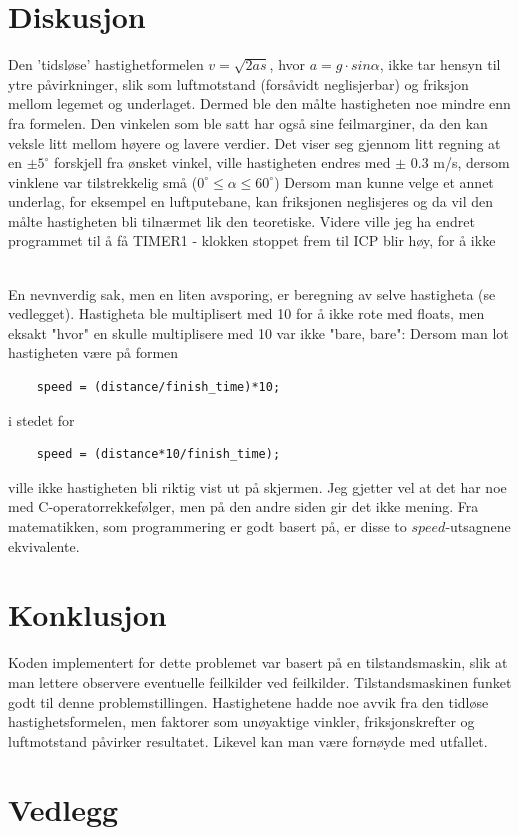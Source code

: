 \documentclass[11pt, a4paper]{article}
\begin{document}
\section{Diskusjon}

Den 'tidsløse' hastighetformelen $v = \sqrt{2as}$, hvor $a = g\cdot sin\alpha$, ikke tar hensyn til ytre påvirkninger, slik som luftmotstand (forsåvidt neglisjerbar) og friksjon mellom legemet og underlaget. Dermed ble den målte hastigheten noe mindre enn fra formelen. Den vinkelen som ble satt har også sine feilmarginer, da den kan veksle litt mellom høyere og lavere verdier. Det viser seg gjennom litt regning at en $\pm 5^{\circ}$ forskjell fra ønsket vinkel, ville hastigheten endres med $\pm$ 0.3 m/s, dersom vinklene var tilstrekkelig små ($0^\circ \leq\alpha\leq 60^\circ$)
\newline
Dersom man kunne velge et annet underlag, for eksempel en luftputebane, kan friksjonen neglisjeres og da vil den målte hastigheten bli tilnærmet lik den teoretiske. Videre ville jeg ha endret programmet til å få TIMER1 - klokken stoppet frem til ICP blir høy, for å ikke 

\\
En nevnverdig sak, men en liten avsporing, er beregning av selve hastigheta (se vedlegget). Hastigheta ble multiplisert med 10 for å ikke rote med floats, men eksakt "hvor" en skulle multiplisere med 10 var ikke "bare, bare": Dersom man lot hastigheten være på formen
\begin{lstlisting}
	speed = (distance/finish_time)*10;
\end{lstlisting}
i stedet for
\begin{lstlisting}
	speed = (distance*10/finish_time);
\end{lstlisting}
ville ikke hastigheten bli riktig vist ut på skjermen. Jeg gjetter vel at det har noe med C-operatorrekkefølger, men på den andre siden gir det ikke mening. Fra matematikken, som programmering er godt basert på, er disse to $speed$-utsagnene ekvivalente. 


\section{Konklusjon}
Koden implementert for dette problemet var basert på en tilstandsmaskin, slik at man lettere observere eventuelle feilkilder ved feilkilder. Tilstandsmaskinen funket godt til denne problemstillingen. Hastighetene hadde noe avvik fra den tidløse hastighetsformelen, men faktorer som unøyaktige vinkler, friksjonskrefter og luftmotstand påvirker resultatet. Likevel kan man være fornøyde med utfallet. 

\section{Vedlegg}
\newpage


\end{document}

